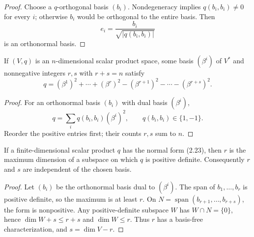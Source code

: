\begin{proof}
\leanok
{}
\sketch Choose a $q$-orthogonal basis $(b_i)$. Nondegeneracy implies
$q(b_i,b_i)\ne0$ for every $i$; otherwise $b_i$ would be orthogonal to the entire
basis. Then
\[
e_i=\frac{b_i}{\sqrt{|q(b_i,b_i)|}}
\]
is an orthonormal basis.
\end{proof}

\begin{corollary}
\label{cor:scalar-product-signature-form}
\leanok
{}
If $(V,q)$ is an $n$-dimensional scalar product space, some basis $(\beta^i)$ of
$V^*$ and nonnegative integers $r,s$ with $r+s=n$ satisfy
\begin{equation}
q=(\beta^1)^2+\cdots+(\beta^r)^2
 -(\beta^{r+1})^2-\cdots-(\beta^{r+s})^2. \tag{2.23}
\end{equation}
\end{corollary}

\begin{proof}
\leanok
{}
\sketch For an orthonormal basis $(b_i)$ with dual basis $(\beta^i)$,
\[
q=\sum_iq(b_i,b_i)(\beta^i)^2,
\qquad q(b_i,b_i)\in\{1,-1\}.
\]
Reorder the positive entries first; their counts $r,s$ sum to $n$.
\end{proof}

\begin{proposition}
\label{prop:sylvesters-law-inertia}
\leanok
{}
If a finite-dimensional scalar product $q$ has the normal form (2.23), then $r$
is the maximum dimension of a subspace on which $q$ is positive definite.
Consequently $r$ and $s$ are independent of the chosen basis.
\end{proposition}

\begin{proof}
\leanok
{}
\sketch Let $(b_i)$ be the orthonormal basis dual to $(\beta^i)$. The span of
$b_1,\ldots,b_r$ is positive definite, so the maximum is at least $r$. On
$N=\operatorname{span}(b_{r+1},\ldots,b_{r+s})$, the form is nonpositive. Any
positive-definite subspace $W$ has $W\cap N=\{0\}$, hence
$\dim W+s\leq r+s$ and $\dim W\leq r$. Thus $r$ has a basis-free
characterization, and $s=\dim V-r$.
\end{proof}

